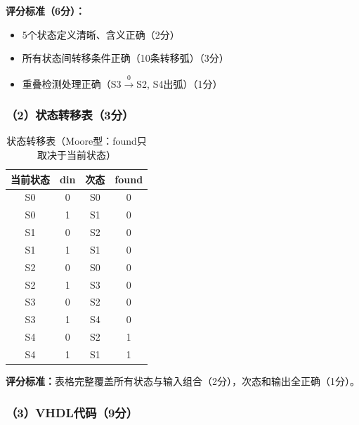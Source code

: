 \textbf{评分标准（6分）：}
\begin{itemize}
  \item 5个状态定义清晰、含义正确\hfill（2分）
  \item 所有状态间转移条件正确（10条转移弧）\hfill（3分）
  \item 重叠检测处理正确（S3$\xrightarrow{0}$S2, S4出弧）\hfill（1分）
\end{itemize}

\subsubsection*{（2）状态转移表（3分）}

\begin{table}[h]
\centering
\caption{状态转移表（Moore型：found只取决于当前状态）}
\begin{tabular}{|c|c|c|c|}
\hline
\textbf{当前状态} & \textbf{din} & \textbf{次态} & \textbf{found} \\
\hline
S0 & 0 & S0 & 0 \\
S0 & 1 & S1 & 0 \\
\hline
S1 & 0 & S2 & 0 \\
S1 & 1 & S1 & 0 \\
\hline
S2 & 0 & S0 & 0 \\
S2 & 1 & S3 & 0 \\
\hline
S3 & 0 & S2 & 0 \\
S3 & 1 & S4 & 0 \\
\hline
S4 & 0 & S2 & 1 \\
S4 & 1 & S1 & 1 \\
\hline
\end{tabular}
\end{table}

\textbf{评分标准：}表格完整覆盖所有状态与输入组合（2分），次态和输出全正确（1分）。

\subsubsection*{（3）VHDL代码（9分）}


